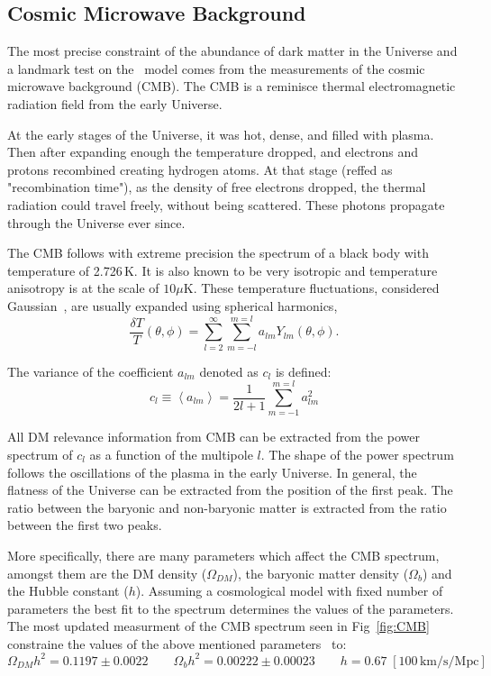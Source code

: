 \subsection{Cosmic Microwave Background}
The most precise constraint of the abundance of dark matter in the Universe and a landmark test on the \cdm\ model comes from the measurements of the cosmic microwave background (CMB). The CMB is a reminisce thermal electromagnetic radiation field from the early Universe. 

At the early stages of the Universe, it was hot, dense, and filled with plasma. Then after expanding enough the temperature dropped, and electrons and protons  recombined creating hydrogen atoms. At that stage (reffed as "recombination time"), as the density of free electrons dropped, the thermal radiation could travel freely, without being scattered. These photons propagate through the Universe ever since.       

The CMB follows with extreme precision the spectrum of a black body with temperature of 2.726\,K. It is also known to be very isotropic and temperature  anisotropy is at the scale of $10\mu$K. These temperature fluctuations, considered Gaussian~\cite{WMAP:9years}, are usually expanded using spherical harmonics,
\begin{equation}
\frac{\delta T }{T}(\theta,\phi) = \sum_{l=2}^{\infty}\sum_{m=-l}^{m=l}a_{lm}Y_{lm}(\theta,\phi). 
\end{equation} 

The variance of the coefficient $a_{lm}$ denoted as $c_l$ is defined:
\begin{equation}
c_l \equiv \left< a_{lm} \right> = \frac{1}{2l+1}\sum_{m=-1}^{m=l}a_{lm}^2
\end{equation}

All DM relevance information from CMB can be extracted from the power spectrum of $c_l$ as a function of the multipole $l$. The shape of the power spectrum follows the oscillations of the plasma in the early Universe. In general, the flatness of the Universe can be extracted from the position of the first peak. The ratio between the baryonic and non-baryonic matter is extracted from the ratio between the first two peaks.   

More specifically, there are many parameters which affect the CMB spectrum, amongst them are the DM density ($\Omega_{DM}$), the baryonic matter density ($\Omega_{b}$) and the Hubble constant ($h$). Assuming a cosmological model with fixed number of parameters the best fit to the spectrum determines the values of the parameters. The most updated measurment of the CMB spectrum seen in Fig~\ref{fig:CMB} constraine the values of the above mentioned parameters~\cite{Planck} to:
\begin{equation}
\Omega_{DM}h^2 = 0.1197 \pm 0.0022 \qquad \Omega_{b}h^2 = 0.00222 \pm 0.00023 \qquad h=0.67\;[100\, \mathrm{km/s/Mpc}] 
\end{equation}

